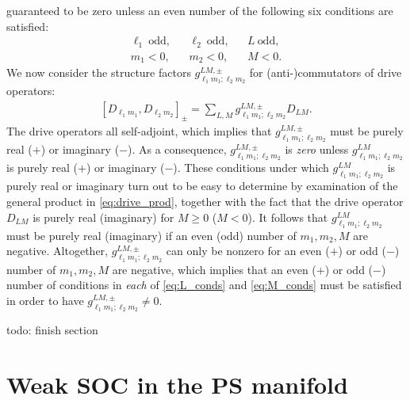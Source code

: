 \documentclass[nofootinbib,notitlepage,11pt]{revtex4-2}
\renewcommand{\t}{\text} %
\renewcommand{\sp}[1]{\left[#1\right]} %
\newcommand{\1}{\mathds{1}}
\newcommand{\red}[1]{{\color{red} #1}}
\begin{document}
guaranteed to be zero unless an even number of the following six
conditions are satisfied:
\begin{align}
  \ell_1 ~ \t{odd},
  &&
  \ell_2 ~ \t{odd},
  &&
  L ~ \t{odd}, \label{eq:L_conds} \\
  m_1 < 0,
  &&
  m_2 < 0,
  &&
  M < 0. \label{eq:M_conds}
\end{align}
We now consider the structure factors
$g_{\ell_1m_1;\ell_2m_2}^{LM,\pm}$ for (anti-)commutators of drive
operators:
\begin{align}
  \sp{D_{\ell_1 m_1}, D_{\ell_2 m_2}}_\pm
  = \sum_{L,M} g_{\ell_1m_1;\ell_2m_2}^{LM,\pm} D_{LM}.
\end{align}
The drive operators all self-adjoint, which implies that
$g_{\ell_1m_1;\ell_2m_2}^{LM,\pm}$ must be purely real ($+$) or
imaginary ($-$).  As a consequence, $g_{\ell_1m_1;\ell_2m_2}^{LM,\pm}$
is {\it zero} unless $g_{\ell_1m_1;\ell_2m_2}^{LM}$ is purely real
($+$) or imaginary ($-$).  These conditions under which
$g_{\ell_1m_1;\ell_2m_2}^{LM}$ is purely real or imaginary turn out to
be easy to determine by examination of the general product in
\eqref{eq:drive_prod}, together with the fact that the drive operator
$D_{LM}$ is purely real (imaginary) for $M\ge0$ ($M<0$).  It follows
that $g_{\ell_1m_1;\ell_2m_2}^{LM}$ must be purely real (imaginary) if
an even (odd) number of $m_1,m_2,M$ are negative.  Altogether,
$g_{\ell_1m_1;\ell_2m_2}^{LM,\pm}$ can only be nonzero for an even
($+$) or odd ($-$) number of $m_1,m_2,M$ are negative, which implies
that an even ($+$) or odd ($-$) number of conditions in {\it each} of
\eqref{eq:L_conds} and \eqref{eq:M_conds} must be satisfied in order
to have $g_{\ell_1m_1;\ell_2m_2}^{LM,\pm}\ne0$.



\red{todo: finish section}

\vspace{2cm}

\section{Weak SOC in the PS manifold}
\label{sec:SOC_pert}
\end{document}
